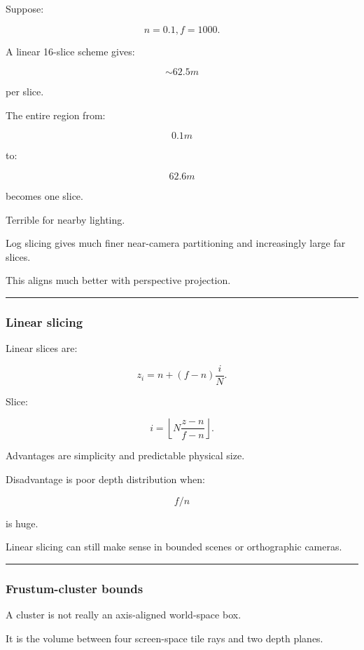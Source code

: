 Suppose:

\[
n=0.1,
f=1000.
\]

A linear 16-slice scheme gives:

\[
\sim62.5m
\]

per slice.

The entire region from:

\[
0.1m
\]

to:

\[
62.6m
\]

becomes one slice.

Terrible for nearby lighting.

Log slicing gives much finer near-camera partitioning and increasingly large far slices.

This aligns much better with perspective projection.

\begin{center}\rule{0.5\linewidth}{0.5pt}\end{center}

\subsubsection{Linear slicing}\label{linear-slicing}

Linear slices are:

\[
\boxed{
z_i=
n+
(f-n)\frac iN.
}
\]

Slice:

\[
\boxed{
i=
\left\lfloor
N
\frac{z-n}{f-n}
\right\rfloor.
}
\]

Advantages are simplicity and predictable physical size.

Disadvantage is poor depth distribution when:

\[
f/n
\]

is huge.

Linear slicing can still make sense in bounded scenes or orthographic cameras.

\begin{center}\rule{0.5\linewidth}{0.5pt}\end{center}

\subsubsection{Frustum-cluster bounds}\label{frustum-cluster-bounds}

A cluster is not really an axis-aligned world-space box.

It is the volume between four screen-space tile rays and two depth planes.

